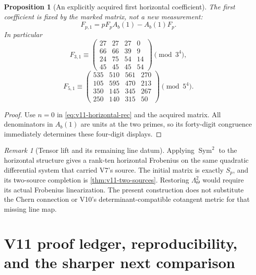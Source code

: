 \documentclass[11pt]{article}
\newtheorem{proposition}[proposition]{Proposition}
\theoremstyle{definition}
\theoremstyle{remark}
\newtheorem{remark}[remark]{Remark}
\begin{document}
\begin{proposition}[An explicitly acquired first horizontal coefficient]
\label{prop:v11-firstjet}
The first coefficient is fixed by the marked matrix, not a new
measurement:
\begin{equation}
 \boxed{F_{p,1}=pF_pA_b(1)-A_b(1)F_p.}
 \label{eq:v11-firstjet}
\end{equation}
In particular
\begin{equation}
 F_{3,1}\equiv
 \begin{pmatrix}27&27&27&0\\66&66&39&9\\24&75&54&14\\45&45&45&54\end{pmatrix}
 \pmod{3^4},
 \label{eq:v11-der3}
\end{equation}
\begin{equation}
 F_{5,1}\equiv
 \begin{pmatrix}535&510&561&270\\105&595&470&213\\350&145&345&267\\250&140&315&50\end{pmatrix}
 \pmod{5^4}.
 \label{eq:v11-der5}
\end{equation}
\end{proposition}
\begin{proof}
Use $n=0$ in \cref{eq:v11-horizontal-rec} and the acquired matrix.
All denominators in $A_b(1)$ are units at the two primes, so its
forty-digit congruence immediately determines these four-digit displays.
\end{proof}

\begin{remark}[Tensor lift and its remaining line datum]
Applying $\operatorname{Sym}^2$ to the horizontal structure gives a
rank-ten horizontal Frobenius on the same quadratic differential system
that carried V7's source. The initial matrix is exactly $S_p$, and its
two-source completion is \cref{thm:v11-two-sources}. Restoring
$\Lambda_\Theta^2$ would require its actual Frobenius linearization.
The present construction does not substitute the Chern connection or
V10's determinant-compatible cotangent metric for that missing line map.
\end{remark}

\section{V11 proof ledger, reproducibility, and the sharper next comparison}
\label{sec:v11-status}
\end{document}
